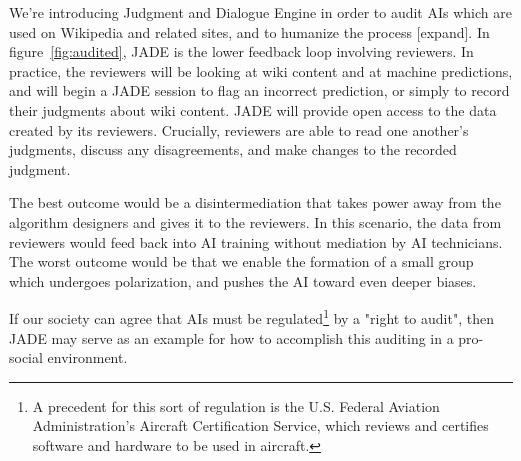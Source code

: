 \documentclass[format=sigconf, authorversion]{acmart}
\begin{document}
We're introducing Judgment and Dialogue Engine in order to audit AIs which are used on Wikipedia and related sites, and to humanize the process [expand].  In figure~\ref{fig:audited}, JADE is the lower feedback loop involving reviewers.  In practice, the reviewers will be looking at wiki content and at machine predictions, and will begin a JADE session to flag an incorrect prediction, or simply to record their judgments about wiki content.  JADE will provide open access to the data created by its reviewers.  Crucially, reviewers are able to read one another's judgments, discuss any disagreements, and make changes to the recorded judgment.

The best outcome would be a disintermediation that takes power away from the algorithm designers and gives it to the reviewers.  In this scenario, the data from reviewers would feed back into AI training without mediation by AI technicians.  The worst outcome would be that we enable the formation of a small group which undergoes polarization, and pushes the AI toward even deeper biases.

If our society can agree that AIs must be regulated\footnote{A precedent for this sort of regulation is the U.S. Federal Aviation Administration's Aircraft Certification Service, which reviews and certifies software and hardware to be used in aircraft.} by a "right to audit", then JADE may serve as an example for how to accomplish this auditing in a pro-social environment.


\end{document}
